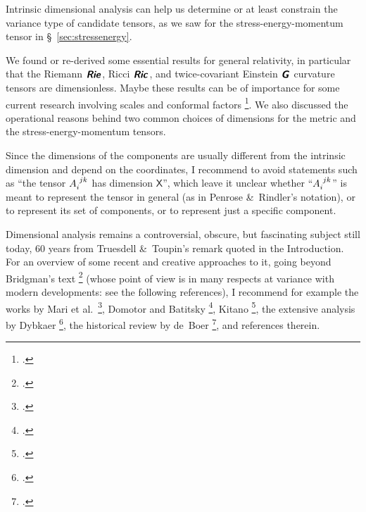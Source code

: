 \documentclass[\ifafour a4paper,12pt,\else a5paper,10pt,\fi%
onecolumn,oneside,article,%
british%
]{memoir}
\makeatletter
\theoremstyle{remark}
\theoremstyle{innote}
\newcommand*{\mathte}[1]{\textbf{\textit{\textsf{#1}}}}
\newcommand*{\citep}{\footcites}
\newcommand*{\amp}{\&}
\renewcommand*{\|}[1][]{\nonscript\,#1\vert\nonscript\;\mathopen{}}
\newcommand*{\sect}{\S}%
\newcommand*{\chap}{ch.}%
\newcommand*{\eqn}{eq.}%
\newcommand*{\eqns}{eqs}%
\newcommand*{\eg}{{e.g.}}
\newcommand*{\etal}{{et al.}}
\newcommand*{\q}{}%
\DeclareRobustCommand*{\q}{%
  \mathord{\mathpalette\bigcdot@{}}%
}
\newcommand*{\bigcdot@scalefactor}{0.7}
\newcommand*{\bigcdot@widthfactor}{1.5}
\newcommand*{\bigcdot@}[2]{%
  \sbox0{$#1\vcenter{}$}%
  \sbox2{$#1\cdot\m@th$}%
  \hbox to \bigcdot@widthfactor\wd2{%
    \hfil
    \raise\ht0\hbox{%
      \scalebox{\bigcdot@scalefactor}{%
        \lower\ht0\hbox{$#1\bullet\m@th$}%
      }%
    }%
    \hfil
  }%
}
\newcommand*{\Xx}{\textsf{X}}
\newcommand*{\yG}{\mathte{G}}
\newcommand*{\yR}{\mathte{Rie}}
\newcommand*{\yRi}{\mathte{Ric}}
\renewcommand*{\i}{\indices}
\makeatother
\begin{document}
Intrinsic dimensional analysis can help us determine or at least constrain
the variance type of candidate tensors, as we saw for the
stress-energy-momentum tensor in \sect~\ref{sec:stressenergy}.

We found or re-derived some essential results for general relativity, in
particular that the Riemann $\yR\i{^{\q}_{\q\q\q}}$, Ricci
$\yRi\i{_{\q\q}}$, and twice-covariant Einstein $\yG\i{_{\q\q}}$ curvature
tensors are dimensionless. Maybe these results can be of importance for
some current research involving scales and conformal factors
\citep[\eg][]{roehretal2005,cadonietal2019}. We also discussed the
operational reasons behind two common choices of dimensions for the metric
and the stress-energy-momentum tensors.

Since the dimensions of the components are usually different from the
intrinsic dimension and depend on the coordinates, I recommend to avoid
statements such as \enquote{the tensor $A\i{_{i}^{jk}}$ has dimension
  $\Xx$}, which leave it unclear whether \enquote{$A\i{_{i}^{jk}}$} is
meant to represent the tensor in general (as in Penrose \amp\ Rindler's
notation), or to represent its set of components, or to represent just a
specific component.


\medskip

Dimensional analysis remains a controversial, obscure, but fascinating
subject still today, 60 years from Truesdell \amp\ Toupin's remark quoted
in the Introduction. For an overview of some recent and creative approaches
to it, going beyond Bridgman's text \citep{bridgman1922_r1963} (whose point
of view is in many respects at variance with modern developments: see the
following references), I recommend for example the works by Mari \etal\
\citep{marietal2012,frigerioetal2010}, Domotor and Batitsky
\citep{domotor2017,domotoretal2016,domotor2012}, Kitano \citep{kitano2013},
the extensive analysis by Dybkaer \citep{dybkaer2004_r2010}, the historical
review by de~Boer \citep{deboer1995}, and references therein.





\end{document}
